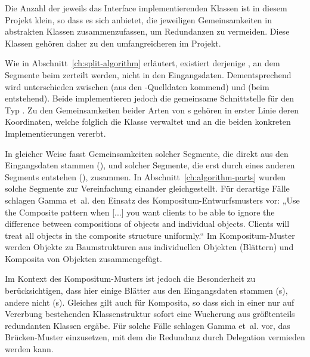 \documentclass[../main/thesis.tex]{subfiles}
\begin{document}
Die Anzahl der jeweils das Interface implementierenden Klassen ist in diesem Projekt klein, so dass es sich anbietet, die jeweiligen Gemeinsamkeiten in abstrakten Klassen
zusammenzufassen, um Redundanzen zu vermeiden.
Diese Klassen gehören daher zu den umfangreicheren im Projekt.

Wie in Abschnitt~\ref{ch:split-algorithm} erläutert, existiert derjenige , an dem Segmente beim  zerteilt werden, nicht in den Eingangsdaten.
Dementsprechend wird unterschieden zwischen  (aus den \osm-Quelldaten kommend) und  (beim  entstehend).
Beide implementieren jedoch die gemeinsame Schnittstelle für den Typ .
Zu den Gemeinsamkeiten beider Arten von s gehören in erster Linie deren Koordinaten, welche folglich die Klasse  verwaltet und an die beiden konkreten Implementierungen vererbt.

In gleicher Weise fasst  Gemeinsamkeiten solcher Segmente, die direkt aus den Eingangsdaten stammen (), und solcher Segmente, die erst durch  eines anderen Segments entstehen (), zusammen.
In Abschnitt~\ref{ch:algorithm-parts} wurden solche Segmente zur Vereinfachung einander gleichgestellt.
Für derartige Fälle schlagen Gamma et~al. den Einsatz des Kompositum-Entwurfsmusters vor:
„Use the Composite pattern when [...] you want clients to be able to ignore the difference between compositions of objects and individual objects. Clients will treat all objects in the composite structure uniformly.“ 
Im Kompositum-Muster werden Objekte zu Baumstrukturen aus individuellen Objekten (Blättern) und Komposita von Objekten zusammengefügt.

Im Kontext des Kompositum-Musters ist jedoch die Besonderheit zu berücksichtigen, dass hier einige Blätter aus den Eingangsdaten stammen (s), andere nicht (s).
Gleiches gilt auch für Komposita, so dass sich in einer nur auf Vererbung bestehenden Klassenstruktur sofort eine Wucherung aus größtenteils redundanten Klassen ergäbe.
Für solche Fälle schlagen Gamma et~al. vor, das Brücken-Muster einzusetzen, mit dem die Redundanz durch Delegation vermieden werden kann. 
\end{document}
